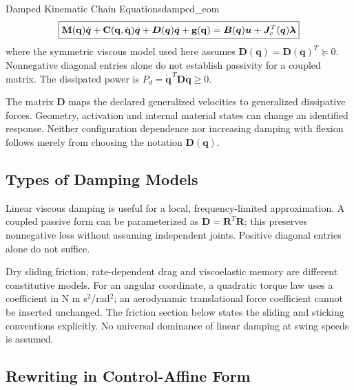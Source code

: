 \begin{principle}{Damped Kinematic Chain Equations}{damped_eom}
\[
\boxed{\mathbf{M}(\mathbf{q})\ddot{\bm{q}} + \mathbf{C}(\mathbf{q},\dot{\mathbf{q}})\dot{\bm{q}} + \bm{D}(\bm{q})\dot{\bm{q}} + \mathbf{g}(\mathbf{q}) = \bm{B}(\bm{q})\bm{u} + \bm{J}_c^T(\bm{q})\boldsymbol{\lambda}}
\]
where the symmetric viscous model used here assumes \(\bm{D}(\bm{q})=\bm{D}(\bm{q})^T\succeq0\). Nonnegative diagonal entries alone do not establish passivity for a coupled matrix. The dissipated power is \(P_d=\dot{\bm q}^{\,T}\bm D\dot{\bm q}\geq0\).
\end{principle}


The matrix \(\bm D\) maps the declared generalized velocities to generalized dissipative forces. Geometry, activation and internal material states can change an identified response. Neither configuration dependence nor increasing damping with flexion follows merely from choosing the notation \(\bm D(\bm q)\).

\subsection{Types of Damping Models}\label{types-of-damping-models}

Linear viscous damping is useful for a local, frequency-limited approximation. A coupled passive form can be parameterized as \(\bm D=\bm R^T\bm R\); this preserves nonnegative loss without assuming independent joints. Positive diagonal entries alone do not suffice.

Dry sliding friction, rate-dependent drag and viscoelastic memory are different constitutive models. For an angular coordinate, a quadratic torque law uses a coefficient in N m s\(^2\)/rad\(^2\); an aerodynamic translational force coefficient cannot be inserted unchanged. The friction section below states the sliding and sticking conventions explicitly. No universal dominance of linear damping at swing speeds is assumed. \subsection{Rewriting in Control-Affine Form}\label{sec-damping-state-map}


